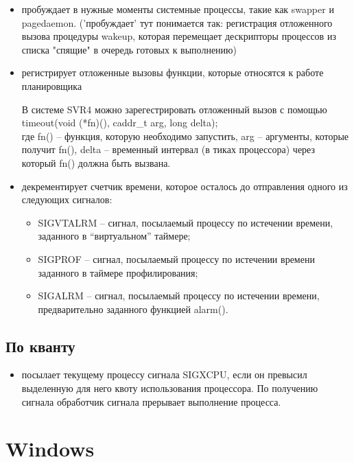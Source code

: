 \begin{itemize}
	\item пробуждает в нужные моменты системные процессы, такие как swapper и pagedaemon. ('пробуждает' тут понимается так: регистрация отложенного вызова процедуры wakeup, которая перемещает дескрипторы процессов из списка "спящие" в очередь готовых к выполнению)
	\item регистрирует отложенные вызовы функции, которые относятся к работе планировщика
	
	В системе SVR4 можно зарегестрировать отложенный вызов с помощью \\ timeout(void (*fn)(), caddr\_t arg, long delta); \\где fn() -- функция, которую необходимо запустить, arg -- аргументы, которые получит fn(), delta -- временный интервал (в тиках процессора) через который fn() должна быть вызвана.
	
	\item декрементирует счетчик времени, которое осталось до отправления одного из следующих сигналов:
	\begin{itemize}
		\item SIGVTALRM – сигнал, посылаемый процессу по истечении времени, заданного в “виртуальном” таймере;
		\item SIGPROF – сигнал, посылаемый процессу по истечении времени заданного в таймере профилирования;
		\item SIGALRM – сигнал, посылаемый процессу по истечении времени, предварительно заданного функцией alarm().	
	\end{itemize}
\end{itemize}

\subsection*{По кванту}

\begin{itemize}
	\item посылает текущему процессу сигнала SIGXCPU, если он превысил выделенную для него квоту использования процессора. По получению сигнала обработчик сигнала прерывает выполнение процесса.
\end{itemize}


\section{Windows}

